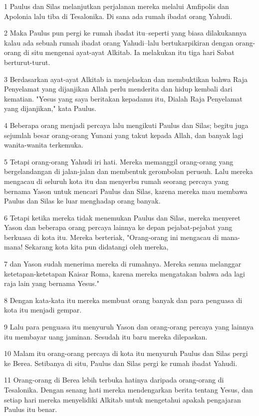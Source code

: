 \par 1 Paulus dan Silas melanjutkan perjalanan mereka melalui Amfipolis dan Apolonia lalu tiba di Tesalonika. Di sana ada rumah ibadat orang Yahudi.
\par 2 Maka Paulus pun pergi ke rumah ibadat itu--seperti yang biasa dilakukannya kalau ada sebuah rumah ibadat orang Yahudi--lalu bertukarpikiran dengan orang-orang di situ mengenai ayat-ayat Alkitab. Ia melakukan itu tiga hari Sabat berturut-turut.
\par 3 Berdasarkan ayat-ayat Alkitab ia menjelaskan dan membuktikan bahwa Raja Penyelamat yang dijanjikan Allah perlu menderita dan hidup kembali dari kematian. "Yesus yang saya beritakan kepadamu itu, Dialah Raja Penyelamat yang dijanjikan," kata Paulus.
\par 4 Beberapa orang menjadi percaya lalu mengikuti Paulus dan Silas; begitu juga sejumlah besar orang-orang Yunani yang takut kepada Allah, dan banyak lagi wanita-wanita terkemuka.
\par 5 Tetapi orang-orang Yahudi iri hati. Mereka memanggil orang-orang yang bergelandangan di jalan-jalan dan membentuk gerombolan perusuh. Lalu mereka mengacau di seluruh kota itu dan menyerbu rumah seorang percaya yang bernama Yason untuk mencari Paulus dan Silas, karena mereka mau membawa Paulus dan Silas ke luar menghadap orang banyak.
\par 6 Tetapi ketika mereka tidak menemukan Paulus dan Silas, mereka menyeret Yason dan beberapa orang percaya lainnya ke depan pejabat-pejabat yang berkuasa di kota itu. Mereka berteriak, "Orang-orang ini mengacau di mana-mana! Sekarang kota kita pun didatangi oleh mereka,
\par 7 dan Yason sudah menerima mereka di rumahnya. Mereka semua melanggar ketetapan-ketetapan Kaisar Roma, karena mereka mengatakan bahwa ada lagi raja lain yang bernama Yesus."
\par 8 Dengan kata-kata itu mereka membuat orang banyak dan para penguasa di kota itu menjadi gempar.
\par 9 Lalu para penguasa itu menyuruh Yason dan orang-orang percaya yang lainnya itu membayar uang jaminan. Sesudah itu baru mereka dilepaskan.
\par 10 Malam itu orang-orang percaya di kota itu menyuruh Paulus dan Silas pergi ke Berea. Setibanya di situ, Paulus dan Silas pergi ke rumah ibadat Yahudi.
\par 11 Orang-orang di Berea lebih terbuka hatinya daripada orang-orang di Tesalonika. Dengan senang hati mereka mendengarkan berita tentang Yesus, dan setiap hari mereka menyelidiki Alkitab untuk mengetahui apakah pengajaran Paulus itu benar.

